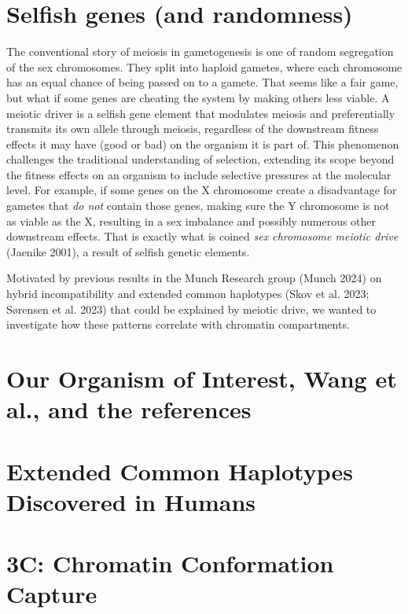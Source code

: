 \documentclass[
  11pt,
  a4paper,
]{scrbook}
\let\oldemph\emph
\renewcommand\emph[1]{\oldemph{\color{gray}#1}}
\begin{document}
\section{Selfish genes (and
randomness)}\label{selfish-genes-and-randomness}

The conventional story of meiosis in gametogenesis is one of random
segregation of the sex chromosomes. They split into haploid gametes,
where each chromosome has an equal chance of being passed on to a
gamete. That seems like a fair game, but what if some genes are cheating
the system by making others less viable. A meiotic driver is a selfish
gene element that modulates meiosis and preferentially transmits its own
allele through meiosis, regardless of the downstream fitness effects it
may have (good or bad) on the organism it is part of. This phenomenon
challenges the traditional understanding of selection, extending its
scope beyond the fitness effects on an organism to include selective
pressures at the molecular level. For example, if some genes on the X
chromosome create a disadvantage for gametes that \emph{do not} contain
those genes, making sure the Y chromosome is not as viable as the X,
resulting in a sex imbalance and possibly numerous other downstream
effects. That is exactly what is coined \emph{sex chromosome meiotic
drive} (Jaenike 2001), a result of selfish genetic elements.

Motivated by previous results in the Munch Research group (Munch 2024)
on hybrid incompatibility and extended common haplotypes (Skov et al.
2023; Sørensen et al. 2023) that could be explained by meiotic drive, we
wanted to investigate how these patterns correlate with chromatin
compartments.

\section{Our Organism of Interest, Wang et al., and the
references}\label{our-organism-of-interest-wang-et-al.-and-the-references}

\section{Extended Common Haplotypes Discovered in
Humans}\label{extended-common-haplotypes-discovered-in-humans}

\section{3C: Chromatin Conformation
Capture}\label{c-chromatin-conformation-capture}
\end{document}
